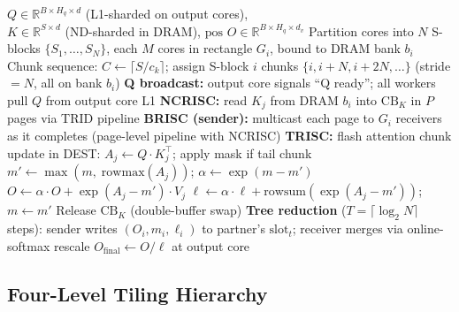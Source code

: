 \documentclass[sigconf, review, anonymous]{acmart}
\newcommand{\brand}{SF-MLA}
\newcommand{\SblockName}{S-block}
\newcommand{\SblockNames}{S-blocks}
\begin{document}
\begin{algorithm}[t]
\caption{\brand Decode Dataflow}\label{alg:dataflow}
\begin{algorithmic}[1]
\renewcommand{\algorithmicrequire}{\textbf{Input:}}
\renewcommand{\algorithmicensure}{\textbf{Output:}}
\REQUIRE $Q \in \mathbb{R}^{B \times H_q \times d}$ (L1-sharded on output cores), \\
\hspace{1.15cm} $K \in \mathbb{R}^{S \times d}$ (ND-sharded in DRAM), $\mathrm{pos}$
\ENSURE $O \in \mathbb{R}^{B \times H_q \times d_v}$
\STATE Partition cores into $N$ \SblockNames{} $\{S_1,\ldots,S_N\}$,
       each $M$ cores in rectangle $G_i$, bound to DRAM bank $b_i$
\STATE Chunk sequence: $C \leftarrow \lceil S/c_k \rceil$;
       assign \SblockName{} $i$ chunks $\{i, i{+}N, i{+}2N, \ldots\}$
       (stride $= N$, all on bank $b_i$)
\STATE \textbf{Q broadcast:} output core signals ``Q ready'';
       all workers pull $Q$ from output core L1
  \STATE \textbf{NCRISC:} read $K_j$ from DRAM $b_i$ into
         $\mathrm{CB}_K$ in $P$ pages via TRID pipeline
  \STATE \textbf{BRISC (sender):} multicast each page to $G_i$
         receivers as it completes (page-level pipeline with NCRISC)
  \STATE \textbf{TRISC:} flash attention chunk update in DEST:
  \STATE \quad $A_j \leftarrow Q \cdot K_j^\top$; \;
         apply mask if tail chunk
  \STATE \quad $m' \leftarrow \max(m,\;\mathrm{rowmax}(A_j))$; \;
         $\alpha \leftarrow \exp(m - m')$
  \STATE \quad $O \leftarrow \alpha \cdot O + \exp(A_j - m') \cdot V_j$
  \STATE \quad $\ell \leftarrow \alpha \cdot \ell + \mathrm{rowsum}(\exp(A_j - m'))$; \;
         $m \leftarrow m'$
  \STATE Release $\mathrm{CB}_K$ (double-buffer swap)
\ENDFOR
\STATE \textbf{Tree reduction} ($T = \lceil\log_2 N\rceil$ steps):
       sender writes $(O_i, m_i, \ell_i)$ to partner's $\mathrm{slot}_t$;
       receiver merges via online-softmax rescale
\STATE $O_{\mathrm{final}} \leftarrow O / \ell$ at output core
\end{algorithmic}
\end{algorithm}



\subsection{Four-Level Tiling Hierarchy}\label{sec:design-tiling}
\end{document}
